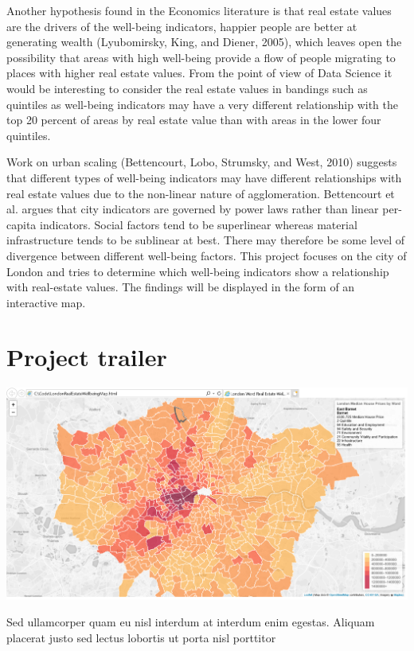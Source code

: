 Another hypothesis found in the Economics literature is that real estate values are the drivers of the well-being indicators, happier people are better at generating wealth (Lyubomirsky, King, and Diener, 2005), which leaves open the possibility that areas with high well-being provide a flow of people migrating to places with higher real estate values. From the point of view of Data Science it would be interesting to consider the real estate values in bandings such as quintiles as well-being indicators may have a very different relationship with the top 20 percent of areas by real estate value than with areas in the lower four quintiles.

Work on urban scaling (Bettencourt, Lobo, Strumsky, and West, 2010) suggests that different types of well-being indicators may have different relationships with real estate values due to the non-linear nature of agglomeration. Bettencourt et al. argues that city indicators are governed by power laws rather than linear per-capita indicators. Social factors tend to be superlinear whereas material infrastructure tends to be sublinear at best. There may therefore be some level of divergence between different well-being factors.
This project focuses on the city of London and tries to determine which well-being indicators show a relationship with real-estate values. The findings will be displayed in the form of an interactive map.



\section{Project trailer}

\includegraphics[scale=0.35]{figures/trailer_1} %

Sed ullamcorper quam eu nisl interdum at interdum enim egestas. Aliquam placerat justo sed lectus lobortis ut porta nisl porttitor